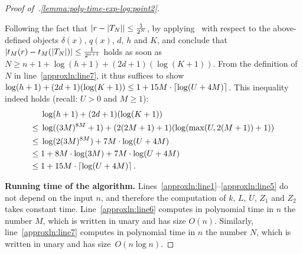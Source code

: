 \begin{proof}[Proof of~.\ref{lemma:poly-time-exp-log:point2}]
\begin{enumerate}
      Following the fact that $\left|r-\left|T_N\right|\right| \leq \frac{1}{2^N}$,
      by applying~ with respect 
      to the above-defined objects $\delta(x)$, $q(x)$, $d$, $h$ and $K$, 
      and conclude that $\left|t_M(r)-t_M(\left|T_N\right|)\right| \leq \frac{1}{2^{n+1}}$ 
      holds as soon as $N \geq n+1+ \log(h+1) + (2 d +1)(\log(K+1))$.
      From the definition of $N$ in line~\ref{approxln:line7}, 
      it thus suffices to show $\log(h+1) + (2 d +1)(\log(K+1)) \leq 1 + 15M \cdot \left\lceil\log(U+4M)\right\rceil$.
      This inequality indeed holds (recall: $U > 0$ and $M \geq 1$): 
      \begin{align*}
          &\log(h+1) + (2 d +1)(\log(K+1))\\
        \leq{}& \log((3M)^{8M}+1) + (2 (2M+1) +1)(\log(\max(U,2(M+1))+1))\\
        \leq{}& \log(2(3M)^{8M}) + 7M \cdot \log(U+4M)\\ 
        \leq{}& 1 + 8M \cdot \log(3M) + 7M \cdot \log(U+4M)\\ 
        \leq{}& 1 + 15M \cdot \left\lceil\log(U+4M)\right\rceil.
      \end{align*}
  \end{enumerate}


  \noindent
  \textbf{Running time of the algorithm.}
  Lines~\ref{approxln:line1}--\ref{approxln:line5} do not 
  depend on the input $n$, and therefore the computation of $k$, $L$, $U$, $Z_1$ and $Z_2$ 
  takes constant time. Line~\ref{approxln:line6} computes in polynomial time in $n$ 
  the number $M$, which is written in unary and has size $O(n)$.
  Similarly, line~\ref{approxln:line7} computes in polynomial time in $n$ 
  the number $N$, which is written in unary and has size~$O(n \log n)$.  
  

\end{proof}
